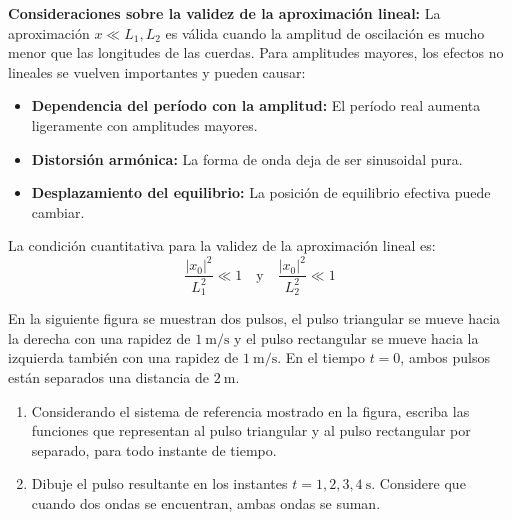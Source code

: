 \documentclass[
  11pt,
  letterpaper,
   addpoints,
  ]{exam}
\begin{document}
\begin{questions}
\begin{solution}
\textbf{Consideraciones sobre la validez de la aproximación lineal:} La aproximación $x \ll L_1, L_2$ es válida cuando la amplitud de oscilación es mucho menor que las longitudes de las cuerdas. Para amplitudes mayores, los efectos no lineales se vuelven importantes y pueden causar:
\begin{itemize}
\item \textbf{Dependencia del período con la amplitud:} El período real aumenta ligeramente con amplitudes mayores.
\item \textbf{Distorsión armónica:} La forma de onda deja de ser sinusoidal pura.
\item \textbf{Desplazamiento del equilibrio:} La posición de equilibrio efectiva puede cambiar.
\end{itemize}

La condición cuantitativa para la validez de la aproximación lineal es:
\begin{equation}
\frac{|x_0|^2}{L_1^2} \ll 1 \quad \text{y} \quad \frac{|x_0|^2}{L_2^2} \ll 1
\end{equation}
\end{solution}

\question En la siguiente figura se muestran dos pulsos, el pulso triangular se mueve hacia la derecha con una rapidez de $1~\mathrm{m/s}$ y el pulso rectangular se mueve hacia la izquierda también con una rapidez de $1~\mathrm{m/s}$. En el tiempo $t=0$, ambos pulsos están separados una distancia de $2~\mathrm{m}$.

\begin{enumerate}
  \item Considerando el sistema de referencia mostrado en la figura, escriba las funciones
  que representan al pulso triangular y al pulso rectangular por separado, para todo instante de tiempo.
  \item Dibuje el pulso resultante en los instantes $t=1,2,3,4~\mathrm{s}$. Considere que cuando
  dos ondas se encuentran, ambas ondas se suman.
\end{enumerate}

\begin{figure}[h!]
\centering
{}
\end{figure}
\end{questions}
\end{document}
